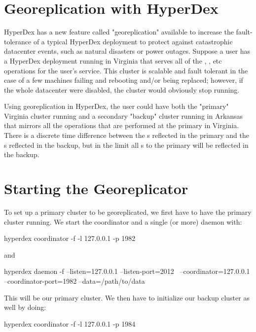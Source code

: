\section{Georeplication with HyperDex}
\label{sec:georepl}

HyperDex has a new feature called "georeplication" available to increase the
fault-tolerance of a typical HyperDex deployment to protect against catastrophic
datacenter events, such as natural disasters or power outages. Suppose a user
has a HyperDex deployment running in Virginia that serves all of the
, , etc operations for the user's service. This cluster
is scalable and fault tolerant in the case of a few machines failing and
rebooting and/or being replaced; however, if the whole datacenter were
disabled, the cluster would obviously stop running.

Using georeplication in HyperDex, the user could have both the
"primary" Virginia cluster running and a secondary "backup" cluster
running in Arkansas that mirrors all the  operations
that are performed at the primary in Virginia. There is a discrete
time difference between the s reflected in the primary
and the s reflected in the backup, but in the limit all
s to the primary will be reflected in the backup.

\section{Starting the Georeplicator}
\label{sec:startgeo}

To set up a primary cluster to be georeplicated, we first have to
have the primary cluster running. We start the coordinator
and a single (or more) daemon with:

\begin{consolecode}
hyperdex coordinator -f -l 127.0.0.1 -p 1982
\end{consolecode}

and

\begin{consolecode}
hyperdex daemon -f --listen=127.0.0.1 --listen-port=2012 \
                   --coordinator=127.0.0.1 --coordinator-port=1982 --data=/path/to/data
\end{consolecode}

This will be our primary cluster. We then have to initialize our backup cluster
as well by doing:

\begin{consolecode}
hyperdex coordinator -f -l 127.0.0.1 -p 1984
\end{consolecode}

